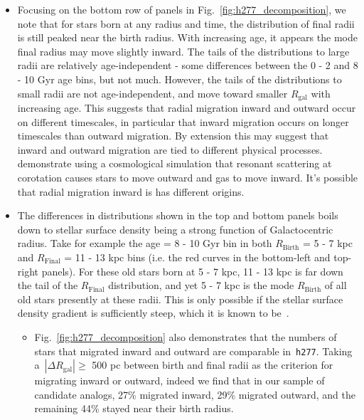 \documentclass[a4paper, fleqn, usenatbib, useAMS]{mnras}
\begin{document}
\begin{itemize}
\begin{itemize}
		\item Focusing on the bottom row of panels in 
		Fig.~\ref{fig:h277_decomposition}, we note that for stars born at any 
		radius and time, the distribution of final radii is still peaked near 
		the birth radius. With increasing age, it appears the mode final radius 
		may move slightly inward. The tails of the distributions to large radii 
		are relatively age-independent - some differences between the 0 - 2 and 
		8 - 10 Gyr age bins, but not much. However, the tails of the 
		distributions to small radii are not age-independent, and move toward 
		smaller $R_\text{gal}$ with increasing age. This suggests that radial 
		migration inward and outward occur on different timescales, in 
		particular that inward migration occurs on longer timescales than 
		outward migration. By extension this may suggest that inward and 
		outward migration are tied to different physical 
		processes.~\citet{Roskar2008a} demonstrate using a cosmological 
		simulation that resonant scattering at corotation causes stars to 
		move outward and gas to move inward. It's possible that radial 
		migration inward is has different origins. 

		\item The differences in distributions shown in the top and bottom 
		panels boils down to stellar surface density being a strong function 
		of Galactocentric radius. Take for example the age = 8 - 10 Gyr bin in 
		both $R_\text{Birth}$ = 5 - 7 kpc and $R_\text{Final}$ = 11 - 13 kpc 
		bins (i.e. the red curves in the bottom-left and top-right panels). 
		For these old stars born at 5 - 7 kpc, 11 - 13 kpc is far down the tail 
		of the $R_\text{Final}$ distribution, and yet 5 - 7 kpc is the mode 
		$R_\text{Birth}$ of all old stars presently at these radii. This is 
		only possible if the stellar surface density gradient is sufficiently 
		steep, which it is known to be~\citep[e.g.][]{Bland-Hawthorn2016}. 
		\begin{itemize} 
			\item Fig.~\ref{fig:h277_decomposition} also demonstrates that the 
			numbers of stars that migrated inward and outward are comparable 
			in~\texttt{h277}. Taking a~$\left|\Delta R_\text{gal}\right| \geq$ 
			500 pc between birth and final radii as the criterion for migrating 
			inward or outward, indeed we find that in our sample of candidate 
			analogs, 27\% migrated inward, 29\% migrated outward, and the 
			remaining 44\% stayed near their birth radius. 
		\end{itemize} 


\end{itemize}
\end{itemize}
\end{document}
